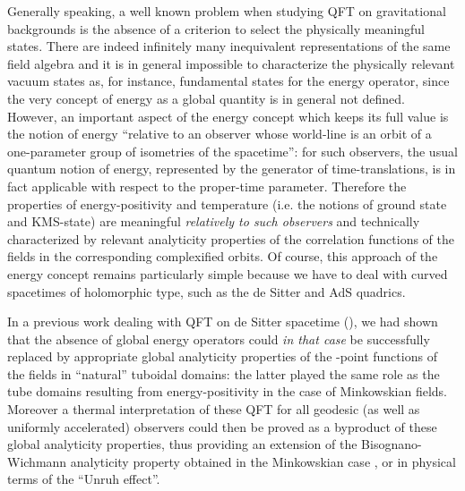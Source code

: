 \documentclass[a4paper,a4paper]{article}
\begin{document}
Generally speaking, a well known problem when studying QFT on
gravitational backgrounds is the absence of a criterion to select
the physically meaningful states. There are indeed infinitely many
inequivalent representations of the same field algebra and it is
in general impossible to characterize the physically relevant
vacuum states as, for instance, fundamental states for the energy
operator, since the very concept of energy as a global quantity
is in general not defined.
However, an important aspect of the energy concept which
keeps its full value is the notion of energy ``relative to
an observer whose world-line is an orbit of a one-parameter
group of isometries of the spacetime'': for such observers,
the usual quantum notion of energy,
represented by the generator of time-translations,
is in fact applicable with respect to the proper-time parameter.
Therefore the properties of
energy-positivity and temperature  (i.e. the notions of
ground state and
KMS-state) are meaningful {\sl relatively to such observers}
and technically characterized by relevant analyticity properties
of the correlation functions of the fields in the corresponding
complexified orbits. Of course, this approach of the energy
concept remains particularly simple because we have to deal
with curved spacetimes of holomorphic type, such as the de Sitter
and AdS quadrics.

In a previous work dealing with
QFT on de Sitter spacetime (\cite{BEM}), we had shown that the
absence of global energy operators could
{\sl in
that case} be successfully replaced
by appropriate global analyticity
properties of the \coordHE{}-point functions of the fields
in ``natural'' tuboidal domains: the latter played the same role as
the tube domains resulting from energy-positivity in the
case of Minkowskian fields. Moreover a thermal interpretation
of these QFT for all geodesic (as well as
uniformly accelerated) observers could then be proved
as a byproduct of these global analyticity properties,
thus providing an extension of the
Bisognano-Wichmann analyticity property obtained in
the Minkowskian case \cite{BW}, or in physical terms
of the ``Unruh effect''.
\end{document}
